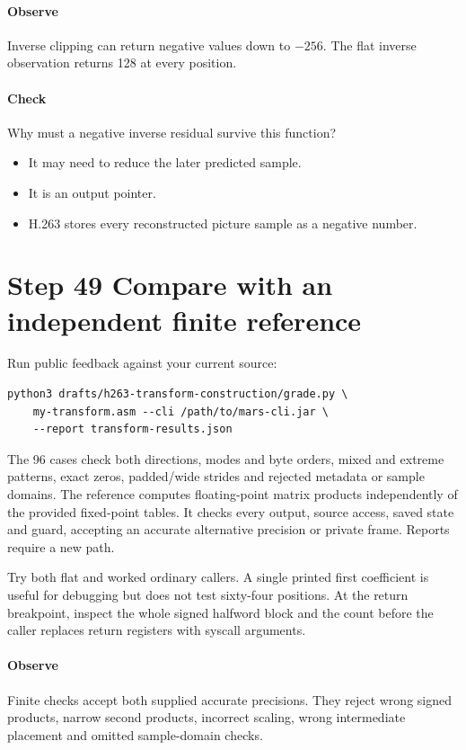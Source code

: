 \paragraph{Observe} Inverse clipping can return negative values down to $-256$.
The flat inverse observation returns 128 at every position.
\paragraph{Check} Why must a negative inverse residual survive this function?
\begin{itemize}
  \item[A.] It may need to reduce the later predicted sample.
  \item[B.] It is an output pointer.
  \item[C.] H.263 stores every reconstructed picture sample as a negative number.
\end{itemize}

\section{Step 49 Compare with an independent finite reference}\label{h263-transform-s09}
Run public feedback against your current source:
\begin{verbatim}
python3 drafts/h263-transform-construction/grade.py \
    my-transform.asm --cli /path/to/mars-cli.jar \
    --report transform-results.json
\end{verbatim}
The 96 cases check both directions, modes and byte orders, mixed and extreme
patterns, exact zeros, padded/wide strides and rejected metadata or sample domains.
The reference computes floating-point matrix products independently of the
provided fixed-point tables. It checks every output, source access, saved state
and guard, accepting an accurate alternative precision or private frame.
Reports require a new path.

Try both flat and worked ordinary callers. A single printed first coefficient
is useful for debugging but does not test sixty-four positions. At the return
breakpoint, inspect the whole signed halfword block and the count before the
caller replaces return registers with syscall arguments.

\paragraph{Observe} Finite checks accept both supplied accurate precisions.
They reject wrong signed products, narrow second products, incorrect scaling,
wrong intermediate placement and omitted sample-domain checks.
\Needspace{8\baselineskip}
